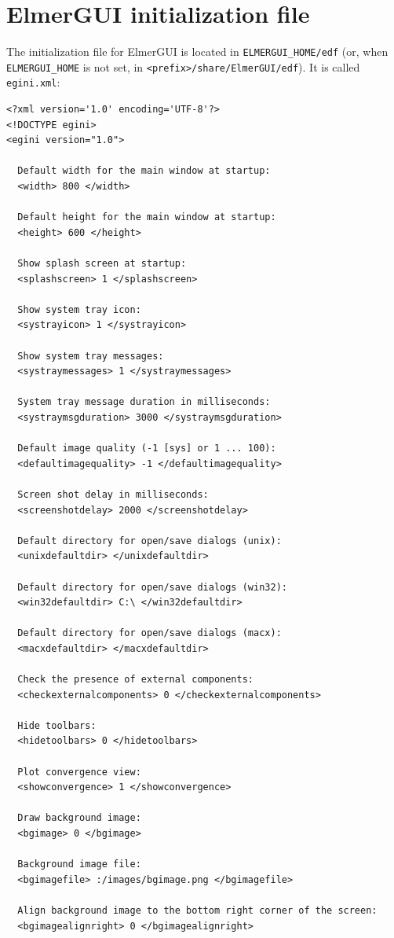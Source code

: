 
\chapter{ElmerGUI initialization file}

The initialization file for ElmerGUI is located in {\tt ELMERGUI\_HOME/edf} (or, when
{\tt ELMERGUI\_HOME} is not set, in {\tt <prefix>/share/ElmerGUI/edf}). It is called {\tt egini.xml}:

\begin{footnotesize}
\begin{verbatim}
<?xml version='1.0' encoding='UTF-8'?>
<!DOCTYPE egini>
<egini version="1.0">

  Default width for the main window at startup:
  <width> 800 </width>

  Default height for the main window at startup:
  <height> 600 </height>

  Show splash screen at startup:
  <splashscreen> 1 </splashscreen>

  Show system tray icon:
  <systrayicon> 1 </systrayicon>

  Show system tray messages:
  <systraymessages> 1 </systraymessages>

  System tray message duration in milliseconds:
  <systraymsgduration> 3000 </systraymsgduration>

  Default image quality (-1 [sys] or 1 ... 100):
  <defaultimagequality> -1 </defaultimagequality>

  Screen shot delay in milliseconds:
  <screenshotdelay> 2000 </screenshotdelay>

  Default directory for open/save dialogs (unix):
  <unixdefaultdir> </unixdefaultdir>

  Default directory for open/save dialogs (win32):
  <win32defaultdir> C:\ </win32defaultdir>

  Default directory for open/save dialogs (macx):
  <macxdefaultdir> </macxdefaultdir>

  Check the presence of external components:
  <checkexternalcomponents> 0 </checkexternalcomponents>

  Hide toolbars:
  <hidetoolbars> 0 </hidetoolbars>

  Plot convergence view:
  <showconvergence> 1 </showconvergence>

  Draw background image:
  <bgimage> 0 </bgimage>

  Background image file:
  <bgimagefile> :/images/bgimage.png </bgimagefile>

  Align background image to the bottom right corner of the screen:
  <bgimagealignright> 0 </bgimagealignright>


\end{verbatim}
\end{footnotesize}

